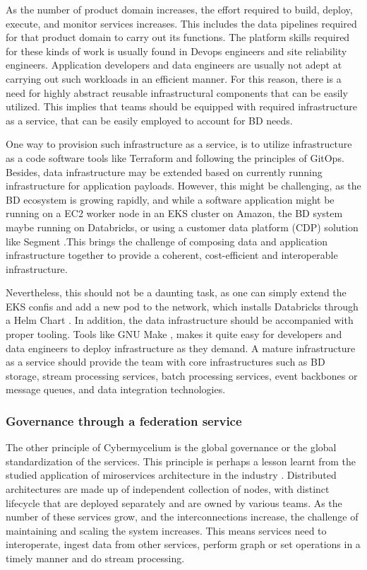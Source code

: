 \documentclass[review]{elsarticle}
\begin{document}
As the number of product domain increases, the effort required to build, deploy, execute, and monitor services increases. This includes the data pipelines required for that product domain to carry out its functions. The platform skills required for these kinds of work is usually found in Devops engineers and site reliability engineers. Application developers and data engineers are usually not adept at carrying out such workloads in an efficient manner. For this reason, there is a need for highly abstract reusable infrastructural components that can be easily utilized. This implies that teams should be equipped with required infrastructure as a service, that can be easily employed to account for BD needs.

One way to provision such infrastructure as a service, is to utilize infrastructure as a code software tools like Terraform \cite{Terraform} and following the principles of GitOps. Besides, data infrastructure may be extended based on currently running infrastructure for application payloads. However, this might be challenging, as the BD ecosystem is growing rapidly, and while a software application might be running on a EC2 worker node in an EKS cluster on Amazon, the BD system maybe running on Databricks, or using a customer data platform (CDP) solution like Segment \cite{Segment}.This brings the challenge of composing data and application infrastructure together to provide a coherent, cost-efficient and interoperable infrastructure.

Nevertheless, this should not be a daunting task, as one can simply extend the EKS confis and add a new pod to the network, which installs Databricks through a Helm Chart \cite{Helm}. In addition, the data infrastructure should be accompanied with proper tooling. Tools like GNU Make \cite{Make}, makes it quite easy for developers and data engineers to deploy infrastructure as they demand.
A mature infrastructure as a service should provide the team with core infrastructures such as BD storage, stream processing services, batch processing services, event backbones or message queues, and data integration technologies.

\subsubsection{Governance through a federation service}

The other principle of Cybermycelium is the global governance or the global standardization of the services. This principle is perhaps a lesson learnt from the studied application of miroservices architecture in the industry \cite{alshuqayran2016systematic}. Distributed architectures are made up of independent collection of nodes, with distinct lifecycle that are deployed separately and are owned by various teams. As the number of these services grow, and the interconnections increase, the challenge of maintaining and scaling the system increases. This means services need to interoperate, ingest data from other services, perform graph or set operations in a timely manner and do stream processing.
\end{document}
